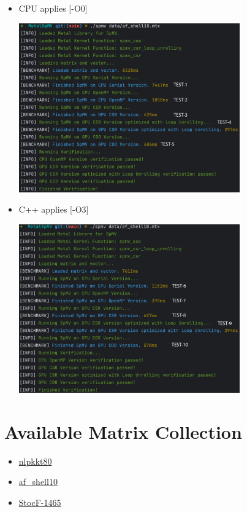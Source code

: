 \documentclass[12pt]{article}
\begin{document}
\begin{itemize}
    \item CPU applies [-O0]
    
    \includegraphics[width=0.75\textwidth]{./images/CPU_O0.png}
    
    \item C++ applies [-O3]
    
    \includegraphics[width=0.75\textwidth]{./images/CPU_O3.png}
    \end{itemize}

\section{Available Matrix Collection}

\begin{itemize}
\item \href{https://suitesparse-collection-website.herokuapp.com/RB/Schenk/nlpkkt80.tar.gz}{nlpkkt80}
\item \href{https://suitesparse-collection-website.herokuapp.com/MM/Schenk_AFE/af_shell10.tar.gz}{af\_shell10}
\item \href{https://suitesparse-collection-website.herokuapp.com/MM/Janna/StocF-1465.tar.gz}{StocF-1465}
\end{itemize}
\end{document}

